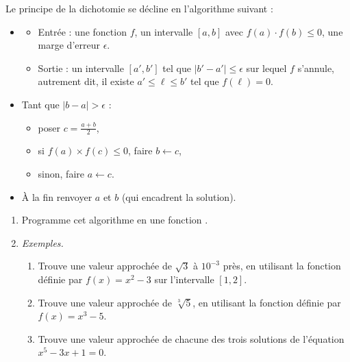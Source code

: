 \documentclass[11pt,class=report,crop=false]{standalone}
\begin{document}
\bigskip



\begin{activite}[Dichotomie]


Le principe de la dichotomie se décline en l'algorithme suivant :
\begin{algorithme}
  \sauteligne 
 \begin{itemize}
   \item 
   \begin{itemize} 
       \item Entrée : une fonction $f$, un intervalle $[a,b]$ avec $f(a)\cdot f(b) \le 0$, une marge d'erreur $\epsilon$.
       \item Sortie : un intervalle $[a',b']$ tel que $|b'-a'| \le \epsilon$ sur lequel $f$ s'annule, autrement dit, il existe $a' \le \ell \le b'$ tel que $f(\ell)=0$.
     \end{itemize}
    
 
  \item Tant que $|b-a| > \epsilon$ :
   \begin{itemize}
     \item poser $c = \frac{a+b}{2}$,
     \item si $f(a) \times f(c) \le 0$, faire $b \leftarrow c$, %
     \item sinon, faire $a \leftarrow c$. %
     \end{itemize}   
     
     
   \item \`A la fin renvoyer $a$ et $b$ (qui encadrent la solution).
 \end{itemize}  
 \end{algorithme}



\begin{enumerate}
  \item Programme cet algorithme en une fonction .
  
  \item \emph{Exemples.} 
  \begin{enumerate}
   \item Trouve une valeur approchée de $\sqrt{3}$ à $10^{-3}$ près, en utilisant la fonction définie par $f(x) = x^2-3$ sur l'intervalle $[1,2]$.
    \item Trouve une valeur approchée de $\sqrt[3]{5}$, en utilisant la fonction définie par $f(x) = x^3-5$.
    \item Trouve une valeur approchée de chacune des trois solutions de l'équation $x^5-3x+1=0$.  
  \end{enumerate}
  

\end{enumerate}
\end{activite}
\end{document}

